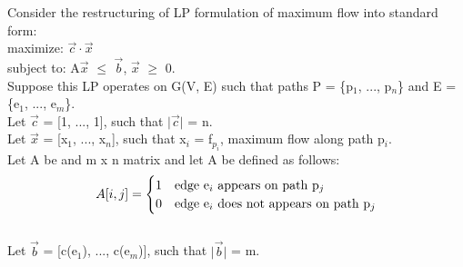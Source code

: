 \documentclass[10pt]{csc_assignment}
\begin{document}
\begin{description}
Consider the restructuring of LP formulation of maximum flow into standard form:\\
maximize: $\vec{c}\cdot\vec{x}$\\
subject to: A$\vec{x}$ $\leqslant$ $\vec{b}$, $\vec{x}$ $\geqslant$ 0.\\
Suppose this LP operates on G(V, E) such that paths P = \{p$_{1}$, ..., p$_{n}$\} and 
E = \{e$_{1}$, ..., e$_{m}$\}.\\
Let $\vec{c}$ = [1, ..., 1], such that $\mid$$\vec{c}$$\mid$ = n.\\
Let $\vec{x}$ = [x$_{1}$, ..., x$_{n}$], such that x$_{i}$ = f$_{p_{i}}$, maximum flow along path p$_{i}$.\\
Let A be and m x n matrix and let A be defined as follows:
\[
A[i, j] = 
\begin{cases} 
      \hfill 1 \hfill & \text{edge e$_{i}$ appears on path p$_{j}$} \\
      \hfill 0 \hfill & \text{edge e$_{i}$ does not appears on path p$_{j}$} \\
  \end{cases}
\]\\
Let $\vec{b}$ = [c(e$_{1}$), ..., c(e$_{m}$)], such that $\mid$$\vec{b}$$\mid$ = m.\\ 


\end{description}
\end{document}
